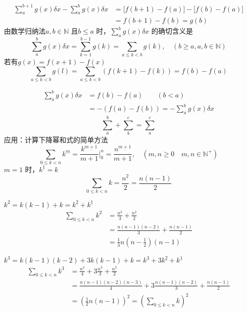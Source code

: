 \documentclass[mode=geye, chinesefont=founder]{elegantnote}
\newcommand{\fallingfactorial}[1]{%
  ^{\underline{#1}}%
}
\begin{document}
\begin{align*}
    \sum_{a}^{b+1}g(x) \delta x - \sum_{a}^{b}g(x) \delta x 
    &= \bigl[f(b+1)-f(a)\bigr] - \bigl[f(b)-f(a)\bigr] \\
    &= f(b+1)-f(b) = g(b)
\end{align*}
由数学归纳法$ a, b \in\mathbb{N} $ 且$ b\leqslant a $ 时，$ \sum_{a}^{b}g(x)\delta x $ 的确切含义是
\begin{equation}
    \sum_{a}^{b}g(x) \delta x = \sum_{k=1}^{b-1}g(k) = \sum_{a\leqslant k < b}g(k),\quad (b\geqslant a, a,b\in \mathbb{N})
\end{equation}
若有$ g(x)=f(x+1)-f(x) $ 
\begin{equation*}
    \sum_{a\leqslant k <b}g(l) = \sum_{a\leqslant k<b}(f(k+1)-f(k))=f(b)-f(a)
\end{equation*}

\begin{align*}
    \sum_{a}^{b}g(x)\delta x &= f(b)-f(a)\qquad (b<a) \\
    &= -(f(a)-f(b)) = -\sum_{a}^{b}g(x)\delta x
\end{align*}
\begin{equation*}
    \sum_{a}^{b}+\sum_{b}^{c} = \sum_{a}^{c}
\end{equation*}
应用：计算下降幂和式的简单方法
\begin{equation}
    \sum_{0\leqslant k<n}k\fallingfactorial{m} = \frac{k\fallingfactorial{m+1}}{m+1}\Big|_0^n = \frac{n\fallingfactorial{m+1}}{m+1},\quad \left(m,n\geqslant 0\quad m,n\in\mathbb{N}^+\right)
\end{equation}
$ m=1 $ 时，$ k\fallingfactorial{1}=k $ 
\begin{equation*}
    \sum_{0\leqslant k<n}k = \frac{n\fallingfactorial{2}}{2}=\frac{n(n-1)}{2}
\end{equation*}

$ k^2 = k(k-1)+k=k\fallingfactorial{2}+k\fallingfactorial{1} $ 
\begin{align*}
    \sum_{0\leqslant k<n} k^2
    &=\frac{n\fallingfactorial{3}}{3} + \frac{n\fallingfactorial{2}}{2} \\
    &=\frac{n(n-1)(n-2)}{3}+\frac{n(n-1)}{2} \\
    &=\frac{1}{3}n(n-\frac{1}{2})(n-1)
\end{align*}

$ k^3 = k(k-1)(k-2) +3k(k-1) +k=k\fallingfactorial{3}+3k\fallingfactorial{2}+k\fallingfactorial{1} $ 
\begin{align*}
    \sum_{0\leqslant k<n} k^3
    &=\frac{n\fallingfactorial{4}}{4}
    +3\frac{n\fallingfactorial{3}}{3}
    + \frac{n\fallingfactorial{2}}{2}\\
    &=\frac{n(n-1)(n-2)(n-3)}{4}+3\frac{n(n-1)(n-2)}{3}+\frac{n(n-1)}{2}\\
    &=\left(\frac{1}{2}n(n-1)\right)^2 = \left(\sum_{0\leqslant k<n} k\right)^2
\end{align*}
\end{document}

